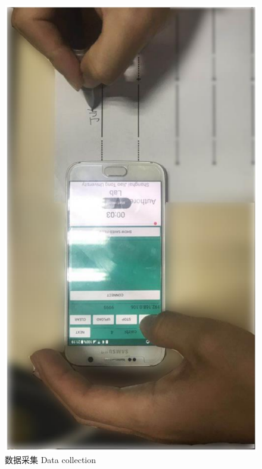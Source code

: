 \begin{figure}
\begin{minipage}[t]{0.32\textwidth}
    \includegraphics[width=\textwidth]{figure/app-data-collection.pdf}
    \bicaption
    {数据采集}
    {Data collection}
    \label{fig:data-collection}
   \end{minipage}
\end{figure}

